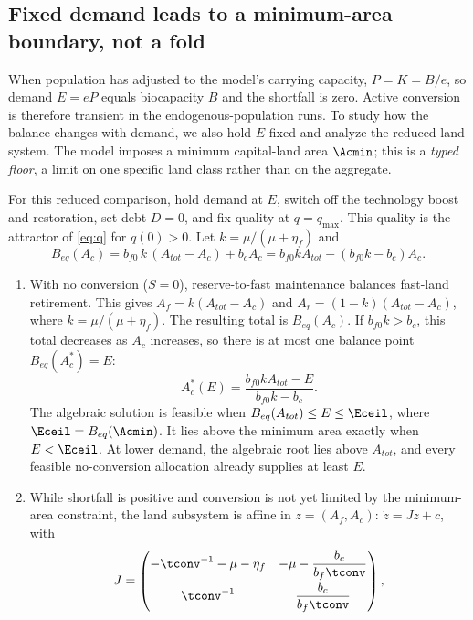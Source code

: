 \subsection{Fixed demand leads to a minimum-area boundary, not a fold}\label{sec:ceiling}

When population has adjusted to the model's carrying capacity, $P=K=B/e$, so demand $E=eP$ equals biocapacity $B$ and the shortfall is zero. Active conversion is therefore transient in the endogenous-population runs. To study how the balance changes with demand, we also hold $E$ fixed and analyze the reduced land system. The model imposes a minimum capital-land area $\Acmin$; this is a \emph{typed floor}, a limit on one specific land class rather than on the aggregate.

\begin{proposition}\label{prop:ceiling}
For this reduced comparison, hold demand at $E$, switch off the technology boost and restoration, set debt $D=0$, and fix quality at $q=q_{\max}$. This quality is the attractor of \eqref{eq:q} for $q(0)>0$. Let $k=\mu/(\mu+\eta_f)$ and
\begin{equation}\label{eq:Beq}
B_{eq}(A_c)=b_{f0}\,k\,(A_{tot}-A_c)+b_cA_c=b_{f0}kA_{tot}-(b_{f0}k-b_c)A_c .
\end{equation}
\begin{enumerate}[label=(\roman*)]
\item With no conversion ($S=0$), reserve-to-fast maintenance balances fast-land retirement. This gives $A_f=k(A_{tot}-A_c)$ and $A_r=(1-k)(A_{tot}-A_c)$, where $k=\mu/(\mu+\eta_f)$. The resulting total is $B_{eq}(A_c)$. If $b_{f0}k>b_c$, this total decreases as $A_c$ increases, so there is at most one balance point $B_{eq}(A_c^*)=E$:
\begin{equation}\label{eq:Acstar}
A_c^*(E)=\frac{b_{f0}kA_{tot}-E}{b_{f0}k-b_c}.
\end{equation}
The algebraic solution is feasible when $B_{eq}(A_{tot})\le E\le\Eceil$, where $\Eceil=B_{eq}(\Acmin)$. It lies above the minimum area exactly when $E<\Eceil$. At lower demand, the algebraic root lies above $A_{tot}$, and every feasible no-conversion allocation already supplies at least $E$.
\item While shortfall is positive and conversion is not yet limited by the minimum-area constraint, the land subsystem is affine in $z=(A_f,A_c)$: $\dot z=Jz+c$, with
\begin{equation}\label{eq:J}
J=\begin{pmatrix}-\tconv^{-1}-\mu-\eta_f & -\mu-\dfrac{b_c}{b_f\tconv}\\[8pt] \tconv^{-1} & \dfrac{b_c}{b_f\tconv}\end{pmatrix},

\end{equation}
\end{enumerate}
\end{proposition}
